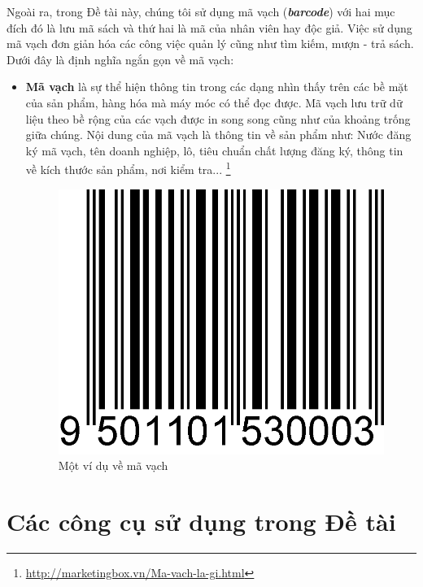 \documentclass[12pt]{report}
\begin{document}
		\par Ngoài ra, trong Đề tài này, chúng tôi sử dụng mã vạch (\textbf{\textit{barcode}}) với hai mục đích đó là lưu mã sách và thứ hai là mã của nhân viên hay độc giả. Việc sử dụng mã vạch đơn giản hóa các công việc quản lý cũng như tìm kiếm, mượn - trả sách. Dưới đây là định nghĩa ngắn gọn về mã vạch:
				\begin{itemize}
					\item{\textbf{Mã vạch} là sự thể hiện thông tin trong các dạng nhìn thấy trên các bề mặt của sản phẩm, hàng hóa mà máy móc có thể đọc được. Mã vạch lưu trữ dữ liệu theo bề rộng của các vạch được in song song cũng như của khoảng trống giữa chúng. Nội dung của mã vạch là thông tin về sản phẩm như: Nước đăng ký mã vạch, tên doanh nghiệp, lô, tiêu chuẩn chất lượng đăng ký, thông tin về kích thước sản phẩm, nơi kiểm tra...} \footnote{\url{http://marketingbox.vn/Ma-vach-la-gi.html}}
					\begin{figure}[H]
					\centering
					\includegraphics[scale=1.6]{images/barcode.png}
					\caption[Một ví dụ về mã vạch]{Một ví dụ về mã vạch \protect\footnotemark{}}
					\label{fig:barcode}
					\end{figure}
				\end{itemize}
			\section{Các công cụ sử dụng trong Đề tài}
\end{document}
